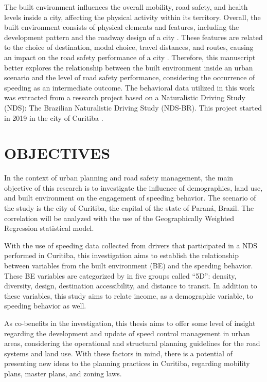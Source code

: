 The built environment influences the overall mobility, road safety, and health levels inside a city, affecting the physical activity within its territory. Overall, the built environment consists of physical elements and features, including the development pattern and the roadway design of a city \cite{Ewing2010}. These features are related to the choice of destination, modal choice, travel distances, and routes, causing an impact on the road safety performance of a city \cite{Tiwari}. Therefore, this manuscript better explores the relationship between the built environment inside an urban scenario and the level of road safety performance, considering the occurrence of speeding as an intermediate outcome. The behavioral data utilized in this work was extracted from a research project based on a Naturalistic Driving Study (NDS): The Brazilian Naturalistic Driving Study (NDS-BR). This project started in 2019 in the city of Curitiba \cite{ceppur_estudo_2021}. 

\section{OBJECTIVES}

In the context of urban planning and road safety management, the main objective of this research is to investigate the influence of demographics, land use, and built environment on the engagement of speeding behavior. The scenario of the study is the city of Curitiba, the capital of the state of Paraná, Brazil. The correlation will be analyzed with the use of the Geographically Weighted Regression statistical model.

With the use of speeding data collected from drivers that participated in a NDS performed in Curitiba, this investigation aims to establish the relationship between variables from the built environment (BE) and the speeding behavior. These BE variables are categorized by \textcite{Ewing2009} in five groups called ``5D'': density, diversity, design, destination accessibility, and distance to transit. In addition to these variables, this study aims to relate income, as a demographic variable, to speeding behavior as well.

As co-benefits in the investigation, this thesis aims to offer some level of insight regarding the development and update of speed control management in urban areas, considering the operational and structural planning guidelines for the road systems and land use. With these factors in mind, there is a potential of presenting new ideas to the planning practices in Curitiba, regarding mobility plans, master plans, and zoning laws.
    
